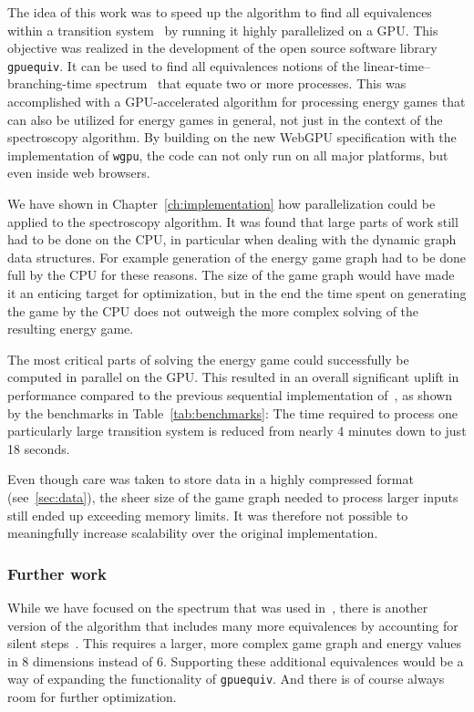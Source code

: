 The idea of this work was to speed up the algorithm to find all equivalences
within a transition system~\cite{bisping2023process} by running it highly
parallelized on a GPU\@.
This objective was realized in the development of the open source software
library \texttt{gpuequiv}.
It can be used to find all equivalences notions of the
linear-time--branching-time spectrum~\cite{glabbeek1990spectrum}
that equate two or more processes.
This was accomplished with a GPU-accelerated algorithm for processing energy
games that can also be utilized for energy games in general,
not just in the context of the spectroscopy algorithm.
By building on the new WebGPU specification with the implementation of
\texttt{wgpu},
the code can not only run on all major platforms,
but even inside web browsers.

We have shown in Chapter~\ref{ch:implementation} how parallelization could be
applied to the spectroscopy algorithm.
It was found that large parts of work still had to be done on the CPU,
in particular when dealing with the dynamic graph data structures.
For example generation of the energy game graph had to be done full by the CPU
for these reasons.
The size of the game graph would have made it an enticing target for
optimization,
but in the end the time spent on generating the game by the CPU does not
outweigh the more complex solving of the resulting energy game.

The most critical parts of solving the energy game could successfully be
computed in parallel on the GPU\@.
This resulted in an overall significant uplift in performance compared to the
previous sequential implementation of~\cite{bisping2023process},
as shown by the benchmarks in Table~\ref{tab:benchmarks}:
The time required to process one particularly large transition system is
reduced from nearly 4 minutes down to just 18 seconds.

Even though care was taken to store data in a highly compressed format
(see~\ref{sec:data}),
the sheer size of the game graph needed to process larger inputs still
ended up exceeding memory limits.
It was therefore not possible to meaningfully increase scalability
over the original implementation.

\subsubsection{Further work}

While we have focused on the spectrum that was used
in~\cite{bisping2023process},
there is another version of the algorithm that includes many more equivalences
by accounting for silent steps~\cite{bisping2023silent}.
This requires a larger,
more complex game graph and energy values in 8 dimensions instead of 6.
Supporting these additional equivalences would be a way of expanding the
functionality of \texttt{gpuequiv}.
And there is of course always room for further optimization.
